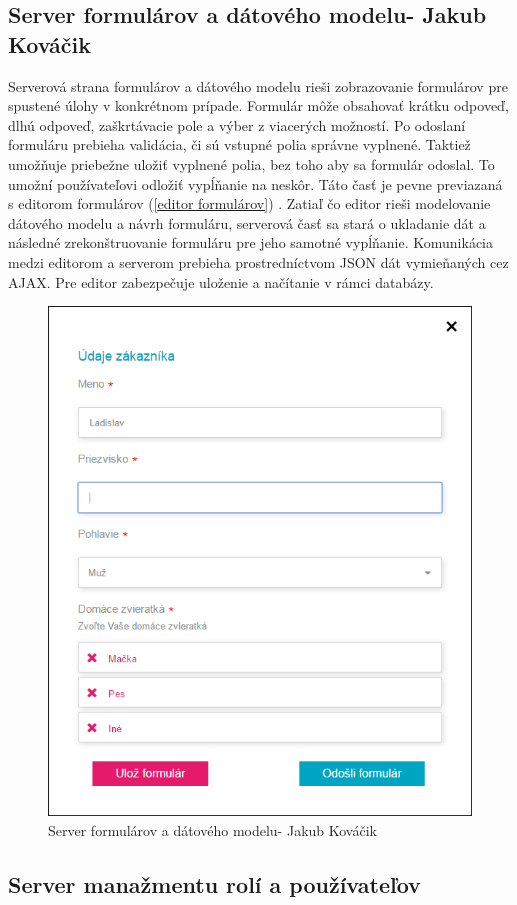 \subsection{Server formulárov a dátového modelu- Jakub Kováčik}
Serverová strana formulárov a dátového modelu rieši zobrazovanie formulárov pre spustené úlohy v konkrétnom prípade. Formulár môže obsahovať krátku odpoveď, dlhú odpoveď, zaškrtávacie pole a výber z viacerých možností. Po odoslaní formuláru prebieha validácia, či sú vstupné polia správne vyplnené. Taktiež umožňuje priebežne uložiť vyplnené polia, bez toho aby sa formulár odoslal. To umožní používateľovi odložiť vypĺňanie na neskôr. Táto časť je pevne previazaná s editorom formulárov (\ref{editor formulárov}) . Zatiaľ čo editor rieši modelovanie dátového modelu a návrh formuláru, serverová časť sa stará o ukladanie dát a následné zrekonštruovanie formuláru pre jeho samotné vypĺňanie. Komunikácia medzi editorom a serverom prebieha prostredníctvom JSON dát vymieňaných cez AJAX. Pre editor zabezpečuje uloženie a načítanie v rámci databázy. 


\begin{figure}[H]
	\centering
	\includegraphics[width=0.7\linewidth]{images/kubko}
	\caption{Server formulárov a dátového modelu- Jakub Kováčik}
	\label{fig:Server formulárov a dátového modelu- Jakub Kováčik}
\end{figure}



\subsection{Server manažmentu rolí a používateľov}

	


	

